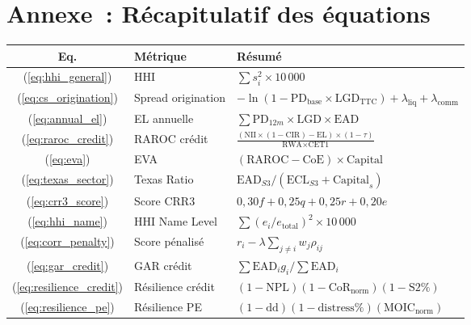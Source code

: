 \documentclass[12pt,a4paper]{article}
\begin{document}
\section*{Annexe~: R\'ecapitulatif des \'equations}
\label{sec:annexe}

\begin{longtable}{clp{8cm}}
\toprule
\textbf{Eq.} & \textbf{M\'etrique} & \textbf{R\'esum\'e} \\
\midrule
\endhead
(\ref{eq:hhi_general}) & HHI & $\sum s_i^2 \times 10\,000$ \\
(\ref{eq:cs_origination}) & Spread origination & $-\ln(1 - \text{PD}_{\text{base}} \times \text{LGD}_{\text{TTC}}) + \lambda_{\text{liq}} + \lambda_{\text{comm}}$ \\
(\ref{eq:annual_el}) & EL annuelle & $\sum \text{PD}_{12m} \times \text{LGD} \times \text{EAD}$ \\
(\ref{eq:raroc_credit}) & RAROC cr\'edit & $\frac{(\text{NII} \times (1-\text{CIR}) - \text{EL}) \times (1-\tau)}{\text{RWA} \times \text{CET1}}$ \\
(\ref{eq:eva}) & EVA & $(\text{RAROC} - \text{CoE}) \times \text{Capital}$ \\
(\ref{eq:texas_sector}) & Texas Ratio & $\text{EAD}_{S3} / (\text{ECL}_{S3} + \text{Capital}_s)$ \\
(\ref{eq:crr3_score}) & Score CRR3 & $0{,}30 f + 0{,}25 q + 0{,}25 r + 0{,}20 e$ \\
(\ref{eq:hhi_name}) & HHI Name Level & $\sum (e_i/e_{\text{total}})^2 \times 10\,000$ \\
(\ref{eq:corr_penalty}) & Score p\'enalis\'e & $r_i - \lambda \sum_{j \neq i} w_j \rho_{ij}$ \\
(\ref{eq:gar_credit}) & GAR cr\'edit & $\sum \text{EAD}_i g_i / \sum \text{EAD}_i$ \\
(\ref{eq:resilience_credit}) & R\'esilience cr\'edit & $(1-\text{NPL})(1-\text{CoR}_{\text{norm}})(1-\text{S2\%})$ \\
(\ref{eq:resilience_pe}) & R\'esilience PE & $(1-\text{dd})(1-\text{distress\%})(\text{MOIC}_{\text{norm}})$ \\
\bottomrule
\end{longtable}
\end{document}
